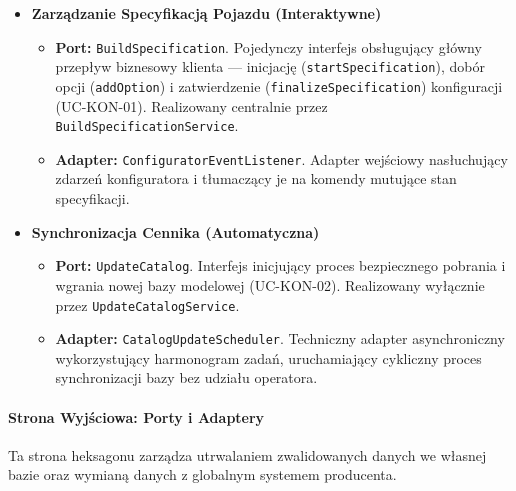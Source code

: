\begin{itemize}
    \item \textbf{Zarządzanie Specyfikacją Pojazdu (Interaktywne)}
    \begin{itemize}
        \item \textbf{Port:} \texttt{BuildSpecification}. Pojedynczy interfejs obsługujący główny przepływ biznesowy klienta — inicjację (\texttt{startSpecification}), dobór opcji (\texttt{addOption}) i zatwierdzenie (\texttt{finalizeSpecification}) konfiguracji (UC-KON-01). Realizowany centralnie przez \texttt{BuildSpecificationService}.
        \item \textbf{Adapter:} \texttt{ConfiguratorEventListener}. Adapter wejściowy nasłuchujący zdarzeń konfiguratora i tłumaczący je na komendy mutujące stan specyfikacji.
    \end{itemize}

    \item \textbf{Synchronizacja Cennika (Automatyczna)}
    \begin{itemize}
        \item \textbf{Port:} \texttt{UpdateCatalog}. Interfejs inicjujący proces bezpiecznego pobrania i wgrania nowej bazy modelowej (UC-KON-02). Realizowany wyłącznie przez \texttt{UpdateCatalogService}.
        \item \textbf{Adapter:} \texttt{CatalogUpdateScheduler}. Techniczny adapter asynchroniczny wykorzystujący harmonogram zadań, uruchamiający cykliczny proces synchronizacji bazy bez udziału operatora.
    \end{itemize}
\end{itemize}

\paragraph{Strona Wyjściowa: Porty i Adaptery} 
Ta strona heksagonu zarządza utrwalaniem zwalidowanych danych we własnej bazie oraz wymianą danych z globalnym systemem producenta.

